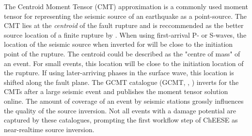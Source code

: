 \documentclass[../Text/00main.tex]{subfiles}
\begin{document}
The Centroid Moment Tensor (CMT) approximation is a commonly used moment tensor for representing the seismic source of an earthquake as a point-source. The CMT lies at the \textit{centroid} of the fault rupture and is reccommended as the better source location of a finite rupture by \citep{dziewonski_determination_1981}. When using first-arrival P- or S-waves, the location of the seismic source when inverted for will be close to the initiation point of the rupture. The centroid could be described as the "centre of mass" of an event. For small events, this location will be close to the initiation location of the rupture. If using later-arriving phases in the surface wave, this location is shifted along the fault plane. The GCMT catalogue (GCMT, \citet{ekstrom2012global}, \citet{dziewonski_determination_1981}) inverts for the CMTs after a large seismic event and publishes the moment tensor solution online. The amount of coverage of an event by seismic stations grossly influences the quality of the source inversion. Not all events with a damage potential are captured by these catalogues, prompting the first workflow step of ChEESE as near-realtime source inversion. 
\end{document}
